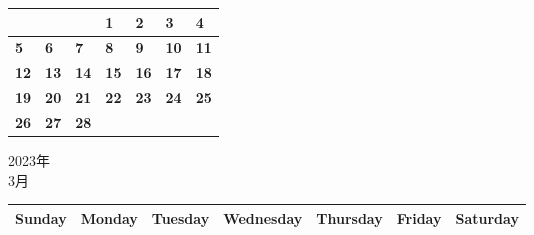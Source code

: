 \documentclass[a4paper,landscape]{jsarticle}
\newcommand{\dig}{\hspace{29mm}}
\newcommand{\tdig}{\hspace{27mm}}
\newcommand{\LBF}{\LARGE\textbf}
\begin{document}
\begingroup
\renewcommand{\arraystretch}{4}
\begin{tabular}{|p{32mm}|p{32mm}|p{32mm}|p{32mm}|p{32mm}|p{32mm}|p{32mm}|}
\hline
&&&\raisebox{30pt} {\dig\LBF{1}}&\raisebox{30pt} {\dig\LBF{2}}&\raisebox{30pt} {\dig\LBF{3}}&\raisebox{30pt} {\dig\LBF{4}}\\
\hline
\raisebox{30pt} {\dig\LBF{5}}&\raisebox{30pt} {\dig\LBF{6}}&\raisebox{30pt} {\dig\LBF{7}}&\raisebox{30pt} {\dig\LBF{8}}&\raisebox{30pt} {\dig\LBF{9}}&\raisebox{30pt} {\tdig\LBF{10}}&\raisebox{30pt} {\tdig\LBF{11}}\\
\hline
\raisebox{30pt} {\tdig\LBF{12}}&\raisebox{30pt} {\tdig\LBF{13}}&\raisebox{30pt} {\tdig\LBF{14}}&\raisebox{30pt} {\tdig\LBF{15}}&\raisebox{30pt} {\tdig\LBF{16}}&\raisebox{30pt} {\tdig\LBF{17}}&\raisebox{30pt} {\tdig\LBF{18}}\\
\hline
\raisebox{30pt} {\tdig\LBF{19}}&\raisebox{30pt} {\tdig\LBF{20}}&\raisebox{30pt} {\tdig\LBF{21}}&\raisebox{30pt} {\tdig\LBF{22}}&\raisebox{30pt} {\tdig\LBF{23}}&\raisebox{30pt} {\tdig\LBF{24}}&\raisebox{30pt} {\tdig\LBF{25}}\\
\hline
\raisebox{30pt} {\tdig\LBF{26}}&\raisebox{30pt} {\tdig\LBF{27}}&\raisebox{30pt} {\tdig\LBF{28}}&&&&\\
\hline
\end{tabular}
\endgroup
\newpage\begin{center}
	\LARGE 2023年\\
	\LARGE 3月
\end{center}

\begingroup
\renewcommand{\arraystretch}{1.4}
\begin{tabular}{|>{\centering\arraybackslash}p{32mm}|>{\centering\arraybackslash}p{32mm}|>{\centering\arraybackslash}p{32mm}|>{\centering\arraybackslash}p{32mm}|>{\centering\arraybackslash}p{32mm}|>{\centering\arraybackslash}p{32mm}|>{\centering\arraybackslash}p{32mm}|}
\hline
\large Sunday&\large Monday &\large Tuesday&\large Wednesday&\large Thursday&\large Friday&\large Saturday\\
\hline
\end{tabular}
\endgroup
\end{document}
